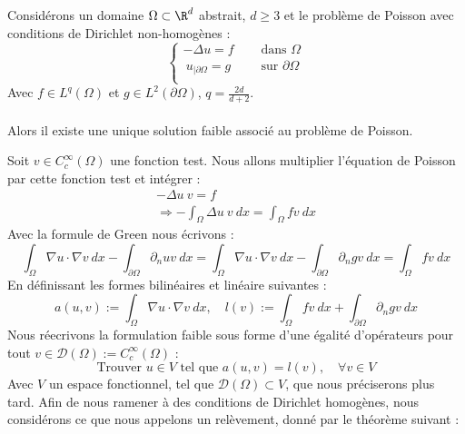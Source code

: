 \begin{theorembox}
\begin{theorem}
    Considérons un domaine $\Omega \subset \R^d$ abstrait, $d \geq 3$ et le problème de Poisson avec conditions de Dirichlet non-homogènes :
    $$ \begin{cases}
        -\Delta u = f \quad &\text{ dans } \Omega \\\
        u_{|\partial \Omega} = g &\text{ sur } \partial \Omega \\
    \end{cases} $$
    Avec $f\in L^q(\Omega)$ et $g \in L^2(\partial \Omega)$, $q = \frac{2d}{d + 2}$.
    \\
    \\
    Alors il existe une unique solution faible associé au problème de Poisson.
\end{theorem}
\end{theorembox}
Soit $v \in C_c^{\infty}(\Omega)$ une fonction test. Nous allons multiplier l'équation de Poisson par cette fonction test et intégrer :
\begin{align*}
    -\Delta u \ v = f \\
    \Rightarrow -\int_{\Omega} \Delta u \ v \ dx = \int_{\Omega} fv \ dx
\end{align*}
Avec la formule de Green nous écrivons :
$$ \int_{\Omega} \nabla u \cdot \nabla v \ dx - \int_{\partial \Omega} \partial_{n} u v \ dx = \int_{\Omega} \nabla u \cdot \nabla v \ dx - \int_{\partial \Omega} \partial_{n}g v \ dx = \int_{\Omega} fv \ dx $$
En définissant les formes bilinéaires et linéaire suivantes :
$$a(u,v) := \int_{\Omega} \nabla u \cdot \nabla v \ dx, \quad l(v) := \int_{\Omega} fv \ dx +  \int_{\partial \Omega} \partial_n g v \ dx $$
Nous réecrivons la formulation faible sous forme d'une égalité d'opérateurs pour tout $v \in \mathcal{D}(\Omega) := C_c^{\infty}(\Omega)$ :
$$\text{Trouver } u \in V \text{ tel que } a(u,v) = l(v), \quad \forall v \in V $$
Avec $V$ un espace fonctionnel, tel que $\mathcal{D}(\Omega) \subset V$, que nous préciserons plus tard.
Afin de nous ramener à des conditions de Dirichlet homogènes, nous considérons ce que nous appelons un relèvement, donné par le théorème suivant :
